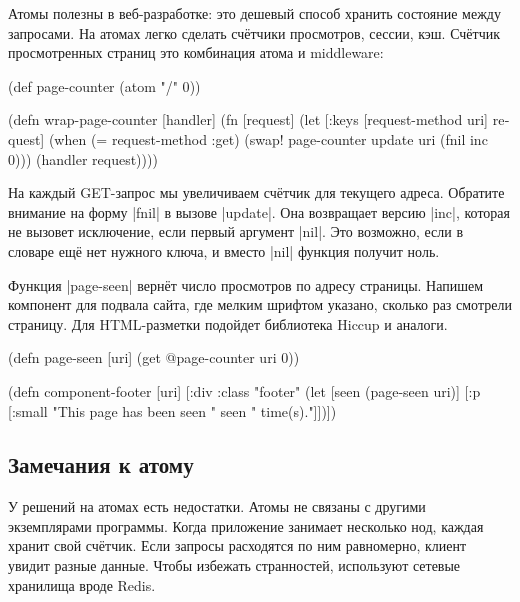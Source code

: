 
Атомы полезны в веб-разработке: это дешевый способ хранить состояние между
запросами. На атомах легко сделать сч\"{е}тчики просмотров, сессии, кэш. Сч\"{е}тчик
просмотренных страниц это комбинация атома и middleware:

\begin{english}
  \begin{clojure}
(def page-counter
  (atom {"/" 0}))

(defn wrap-page-counter
  [handler]
  (fn [request]
    (let [{:keys [request-method uri]} request]
      (when (= request-method :get)
        (swap! page-counter update uri (fnil inc 0)))
      (handler request))))
  \end{clojure}
\end{english}


На каждый GET-запрос мы увеличиваем сч\"{е}тчик для текущего адреса. Обратите
внимание на форму \spverb|fnil| в вызове \spverb|update|. Она возвращает версию
\spverb|inc|, которая не вызовет исключение, если первый аргумент
\spverb|nil|. Это возможно, если в словаре ещ\"{е} нет нужного ключа, и вместо
\spverb|nil| функция получит ноль.


Функция \spverb|page-seen| верн\"{е}т число просмотров по адресу страницы. Напишем
компонент для подвала сайта, где мелким шрифтом указано, сколько раз смотрели
страницу. Для HTML-разметки подойдет библиотека
Hiccup и аналоги.

\begin{english}
  \begin{clojure}
(defn page-seen [uri]
  (get @page-counter uri 0))

(defn component-footer [uri]
  [:div {:class "footer"}
   (let [seen (page-seen uri)]
     [:p [:small "This page has been seen " seen " time(s)."]])])
  \end{clojure}
\end{english}

\subsection{Замечания к атому}

У решений на атомах есть недостатки. Атомы не связаны с другими экземплярами
программы. Когда приложение занимает несколько нод, каждая хранит свой
сч\"{е}тчик. Если запросы расходятся по ним равномерно, клиент увидит разные
данные. Чтобы избежать странностей, используют сетевые хранилища вроде Redis.

